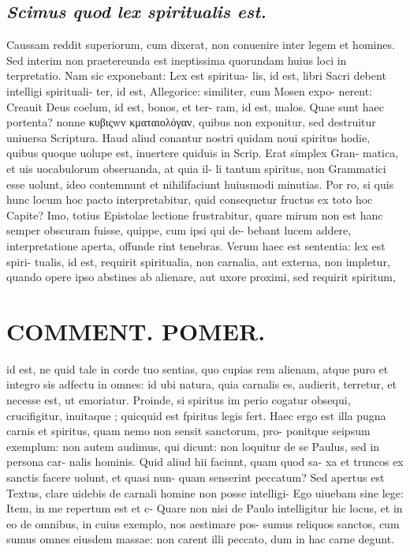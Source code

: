\documentclass{article}
\begin{document}
\begin{pages}
\subsection*{\textit{Scimus quod lex spiritualis est. }}\pstart Caussam reddit superiorum, cum dixerat, non conuenire inter legem et homines. Sed interim non praetereunda est ineptissima quorundam huius loci in terpretatio. Nam sic exponebant: Lex est spiritua- lis, id est, libri Sacri debent intelligi spirituali- ter, id est, Allegorice: similiter, cum Mosen expo- nerent: Creauit Deus coelum, id est, bonos, et ter- ram, id est, malos. Quae sunt haec portenta? nonne κυβιςwν κματαιολόγαν, quibus non exponitur, sed destruitur uniuersa Scriptura. Haud aliud conantur nostri quidam noui spiritus hodie, quibus quoque uolupe est, inuertere quiduis in Scrip. Erat simplex Gran- matica, et uis uocabulorum obseruanda, at quia il- li tantum spiritus, non Grammatici esse uolunt, ideo contemnunt et nihilifaciunt huiusmodi minutias. Por ro, si quis hunc locum hoc pacto interpretabitur, quid consequetur fructus ex toto hoc Capite? Imo, totius Epistolae lectione frustrabitur, quare mirum non est hanc semper obscuram fuisse, quippe, cum ipsi qui de- bebant lucem addere, interpretatione aperta, offunde rint tenebras. Verum haec est sententia: lex est spiri- tualis, id est, requirit spiritualia, non carnalia, aut externa, non impletur, quando opere ipso abstines ab alienare, aut uxore proximi, sed requirit spiritum,  \pend
\section*{COMMENT. POMER.  }\pstart id est, ne quid tale in corde tuo sentias, quo cupias rem alienam, atque puro et integro sis adfectu in omnes: id ubi natura, quia carnalis es, audierit, terretur, et necesse est, ut emoriatur. Proinde, si spiritus im perio cogatur obsequi, crucifigitur, inuitaque ; quicquid est fpiritus legis fert. Haec ergo est illa pugna carnis et spiritus, quam nemo non sensit sanctorum, pro- ponitque seipsum exemplum: non autem audimus, qui dicunt: non loquitur de se Paulus, sed in persona car- nalis hominis. Quid aliud hii faciunt, quam quod sa- xa et truncos ex sanctis facere uolunt, et quasi nun- quam senserint peccatum? Sed apertus est Textus, clare uidebis de carnali homine non posse intelligi- Ego uiuebam sine lege: Item, in me repertum est et c- Quare non nisi de Paulo intelligitur hic locus, et in eo de omnibus, in cuius exemplo, nos aestimare pos- sumus reliquos sanctos, cum sumus omnes eiusdem massae: non carent illi peccato, dum in hac carne degunt.   \pend
{}
{}

\end{pages}
\end{document}
